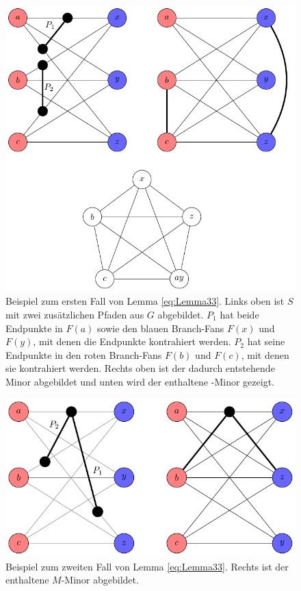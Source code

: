 \newpage

\begin{figure}[H]
  \centering
  \includegraphics[keepaspectratio]{bilder/Lemma331.pdf}
  \caption{Beispiel zum ersten Fall von Lemma \ref{eq:Lemma33}.
           Links oben ist $S$ mit zwei zusätzlichen Pfaden aus $G$ abgebildet.
           $P_1$ hat beide Endpunkte in $F(a)$ sowie den blauen Branch-Fans $F(x)$ und $F(y)$, mit denen die Endpunkte kontrahiert werden.
           $P_2$ hat seine Endpunkte in den roten Branch-Fans $F(b)$ und $F(c)$, mit denen sie kontrahiert werden.
           Rechts oben ist der dadurch entstehende Minor abgebildet und unten wird der enthaltene \kf-Minor gezeigt.}
  \label{fig:Lemma331}
\end{figure}
\begin{figure}[H]
  \centering
  \includegraphics[keepaspectratio]{bilder/Lemma332.pdf}
  \caption{Beispiel zum zweiten Fall von Lemma \ref{eq:Lemma33}.
           Rechts ist der enthaltene $M$-Minor abgebildet.}
  \label{fig:Lemma332}
\end{figure}

